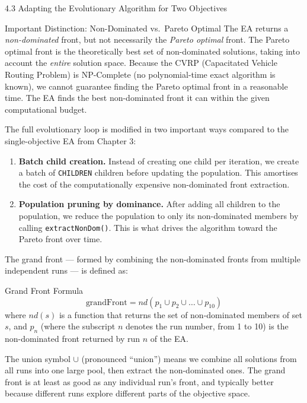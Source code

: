 \documentclass[aspectratio=169,10pt]{beamer}
\begin{document}
\begin{frame}[allowframebreaks]{4.3 Adapting the Evolutionary Algorithm for Two Objectives}
  \begin{alertblock}{Important Distinction: Non-Dominated vs.\ Pareto Optimal}
    The EA returns a \emph{non-dominated} front, but not necessarily the
    \emph{Pareto optimal} front.  The Pareto optimal front is the theoretically
    best set of non-dominated solutions, taking into account the \emph{entire}
    solution space.  Because the CVRP (Capacitated Vehicle Routing Problem) is
    NP-Complete (no polynomial-time exact algorithm is known), we cannot guarantee
    finding the Pareto optimal front in a reasonable time.  The EA finds the best
    non-dominated front it can within the given computational budget.
  \end{alertblock}

  \framebreak

  The full evolutionary loop is modified in two important ways compared to the
  single-objective EA from Chapter 3:

  \begin{enumerate}
    \item \textbf{Batch child creation.} Instead of creating one child per
      iteration, we create a batch of \texttt{CHILDREN} children before updating
      the population.  This amortises the cost of the computationally expensive
      non-dominated front extraction.
    \item \textbf{Population pruning by dominance.} After adding all children to
      the population, we reduce the population to only its non-dominated members
      by calling \texttt{extractNonDom()}.  This is what drives the algorithm
      toward the Pareto front over time.
  \end{enumerate}

  The grand front --- formed by combining the non-dominated fronts from multiple
  independent runs --- is defined as:

  \begin{block}{Grand Front Formula}
    \[
      \text{grandFront} = nd(p_1 \cup p_2 \cup \ldots \cup p_{10})
    \]
    where $nd(s)$ is a function that returns the set of non-dominated members
    of set $s$, and $p_n$ (where the subscript $n$ denotes the run number, from
    1 to 10) is the non-dominated front returned by run $n$ of the EA.
  \end{block}

  The union symbol $\cup$ (pronounced ``union'') means we combine all solutions
  from all runs into one large pool, then extract the non-dominated ones.  The
  grand front is at least as good as any individual run's front, and typically
  better because different runs explore different parts of the objective space.

\end{frame}
\end{document}
